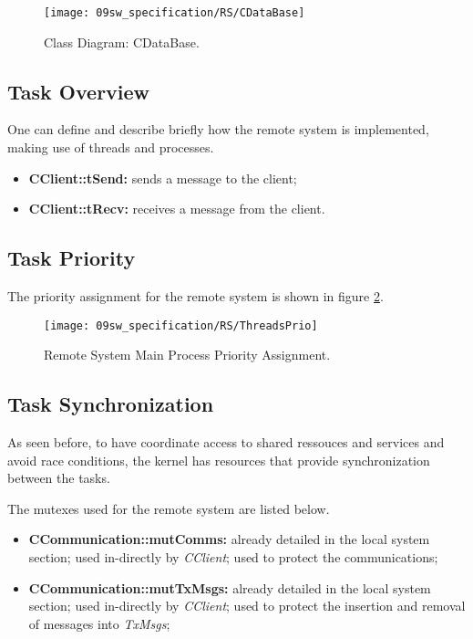 \begin{figure}[H]
	\centering
	\texttt{[image: 09sw\_specification/RS/CDataBase]}
	\caption{Class Diagram: CDataBase.}
	\label{fig:CDataBase}
\end{figure}

\subsection{Task Overview}
One can define and describe briefly how the remote system is implemented, making use of threads and processes. 

\begin{itemize}
	\item \textbf{CClient::tSend:} sends a message to the client;
	\item \textbf{CClient::tRecv:} receives a message from the client.
\end{itemize}

\subsection{Task Priority}
The priority assignment for the remote system is shown in figure \ref{fig:rsPrio}. 

\begin{figure}[H]
	\centering
	\texttt{[image: 09sw\_specification/RS/ThreadsPrio]}
	\caption{Remote System Main Process Priority Assignment.}
	\label{fig:rsPrio}
\end{figure}

\subsection{Task Synchronization}
As seen before, to have coordinate access to shared ressouces and services and avoid race conditions, the kernel has resources that provide synchronization between the tasks. 


The mutexes used for the remote system are listed below.

\begin{itemize}
	\item \textbf{CCommunication::mutComms:} already detailed in the local system section; used in-directly by \textit{CClient}; used to protect the communications;
	\item \textbf{CCommunication::mutTxMsgs:} already detailed in the local system section; used in-directly by \textit{CClient}; used to protect the insertion and removal of messages into \textit{TxMsgs};
\end{itemize}

